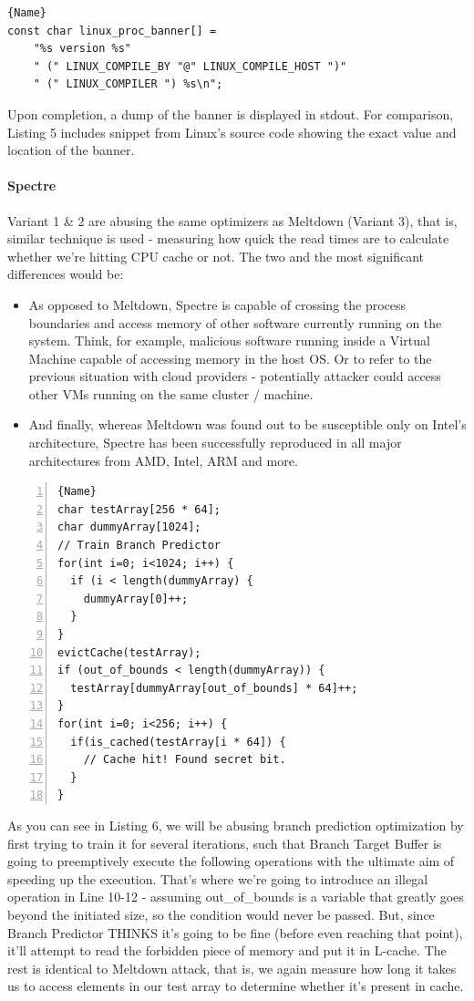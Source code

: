 \documentclass{article}
\begin{document}
\begin{lstlisting}[caption=init/version.c from Linux kernel source code, frame=tlrb, breaklines=true]{Name}
const char linux_proc_banner[] =
	"%s version %s"
	" (" LINUX_COMPILE_BY "@" LINUX_COMPILE_HOST ")"
	" (" LINUX_COMPILER ") %s\n";
\end{lstlisting}

Upon completion, a dump of the banner is displayed in stdout. For comparison, Listing 5 includes snippet from Linux's source code \cite{linuxsrc} showing the exact value and location of the banner. 

\paragraph{Spectre}
Variant 1 \& 2 are abusing the same optimizers as Meltdown (Variant 3), that is, similar technique is used - measuring how quick the read times are to calculate whether we're hitting CPU cache or not. The two and the most significant differences would be:

\begin{itemize}
  \item As opposed to Meltdown, Spectre is capable of crossing the process boundaries and access memory of other software currently running on the system. Think, for example, malicious software running inside a Virtual Machine capable of accessing memory in the host OS. Or to refer to the previous situation with cloud providers - potentially attacker could access other VMs running on the same cluster / machine.
  \item And finally, whereas Meltdown was found out to be susceptible only on Intel's architecture, Spectre has been successfully reproduced in all major architectures from AMD, Intel, ARM and more. 
\end{itemize}

\begin{lstlisting}[caption=Spectre PoC,frame=tlrb, numbers=left, firstnumber=1]{Name}
char testArray[256 * 64];
char dummyArray[1024];
// Train Branch Predictor
for(int i=0; i<1024; i++) {
  if (i < length(dummyArray) {
    dummyArray[0]++;
  }
}
evictCache(testArray);
if (out_of_bounds < length(dummyArray)) {
  testArray[dummyArray[out_of_bounds] * 64]++;
}
for(int i=0; i<256; i++) {
  if(is_cached(testArray[i * 64]) {
    // Cache hit! Found secret bit.
  }
}
\end{lstlisting}

As you can see in Listing 6, we will be abusing branch prediction optimization by first trying to train it for several iterations, such that Branch Target Buffer is going to preemptively execute the following operations with the ultimate aim of speeding up the execution. That's where we're going to introduce an illegal operation in Line 10-12 - assuming out\_of\_bounds is a variable that greatly goes beyond the initiated size, so the condition would never be passed. But, since Branch Predictor THINKS it's going to be fine (before even reaching that point), it'll attempt to read the forbidden piece of memory and put it in L-cache. The rest is identical to Meltdown attack, that is, we again measure how long it takes us to access elements in our test array to determine whether it's present in cache.
\end{document}
